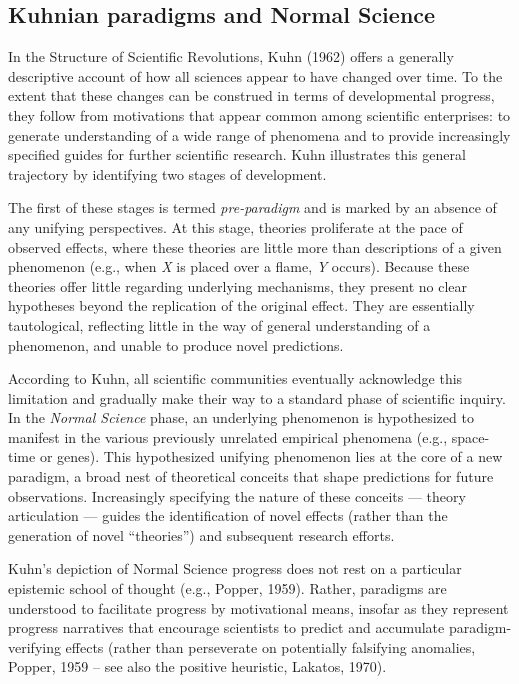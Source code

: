 \documentclass[english,floatsintext,man]{apa6}
\theoremstyle{definition}
\theoremstyle{definition}
\theoremstyle{definition}
\theoremstyle{remark}
\begin{document}
\hypertarget{kuhnian-paradigms-and-normal-science}{%
\subsection{Kuhnian paradigms and Normal
Science}\label{kuhnian-paradigms-and-normal-science}}

In the Structure of Scientific Revolutions, Kuhn (1962) offers a
generally descriptive account of how all sciences appear to have changed
over time. To the extent that these changes can be construed in terms of
developmental progress, they follow from motivations that appear common
among scientific enterprises: to generate understanding of a wide range
of phenomena and to provide increasingly specified guides for further
scientific research. Kuhn illustrates this general trajectory by
identifying two stages of development.

The first of these stages is termed \emph{pre-paradigm} and is marked by
an absence of any unifying perspectives. At this stage, theories
proliferate at the pace of observed effects, where these theories are
little more than descriptions of a given phenomenon (e.g., when \emph{X}
is placed over a flame, \emph{Y} occurs). Because these theories offer
little regarding underlying mechanisms, they present no clear hypotheses
beyond the replication of the original effect. They are essentially
tautological, reflecting little in the way of general understanding of a
phenomenon, and unable to produce novel predictions.

According to Kuhn, all scientific communities eventually acknowledge
this limitation and gradually make their way to a standard phase of
scientific inquiry. In the \emph{Normal Science} phase, an underlying
phenomenon is hypothesized to manifest in the various previously
unrelated empirical phenomena (e.g., space-time or genes). This
hypothesized unifying phenomenon lies at the core of a new paradigm, a
broad nest of theoretical conceits that shape predictions for future
observations. Increasingly specifying the nature of these conceits ---
theory articulation --- guides the identification of novel effects
(rather than the generation of novel \enquote{theories}) and subsequent
research efforts.

Kuhn's depiction of Normal Science progress does not rest on a
particular epistemic school of thought (e.g., Popper, 1959). Rather,
paradigms are understood to facilitate progress by motivational means,
insofar as they represent progress narratives that encourage scientists
to predict and accumulate paradigm-verifying effects (rather than
perseverate on potentially falsifying anomalies, Popper, 1959 -- see
also the positive heuristic, Lakatos, 1970).
\end{document}
